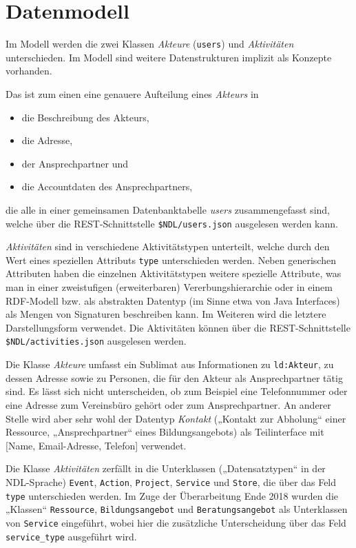 \documentclass[a4paper,11pt]{article}
\begin{document}
\section{Datenmodell}

Im Modell werden die zwei Klassen \emph{Akteure} (\texttt{users}) und
\emph{Aktivitäten} unterschieden.  Im Modell sind weitere Datenstrukturen
implizit als Konzepte vorhanden.

Das ist zum einen eine genauere Aufteilung eines \emph{Akteurs} in
\begin{itemize}\itemsep0pt
\item die Beschreibung des Akteurs,
\item die Adresse,
\item der Ansprechpartner und
\item die Accountdaten des Ansprechpartners,
\end{itemize}
die alle in einer gemeinsamen Datenbanktabelle \emph{users} zusammengefasst
sind, welche über die REST-Schnittstelle \texttt{\$NDL/users.json} ausgelesen
werden kann.

\emph{Aktivitäten} sind in verschiedene Aktivitätstypen unterteilt, welche
durch den Wert eines speziellen Attributs \texttt{type} unterschieden werden.
Neben generischen Attributen haben die einzelnen Aktivitätstypen weitere
spezielle Attribute, was man in einer zweistufigen (erweiterbaren)
Vererbungshierarchie oder in einem RDF-Modell bzw. als abstrakten Datentyp (im
Sinne etwa von Java Interfaces) als Mengen von Signaturen beschreiben kann.
Im Weiteren wird die letztere Darstellungsform verwendet. Die Aktivitäten
können über die REST-Schnittstelle \texttt{\$NDL/activities.json} ausgelesen
werden.

Die Klasse \emph{Akteure} umfasst ein Sublimat aus Informationen zu
\texttt{ld:Akteur}, zu dessen Adresse sowie zu Personen, die für den Akteur
als Ansprechpartner tätig sind.  Es lässt sich nicht unterscheiden, ob zum
Beispiel eine Telefonnummer oder eine Adresse zum Vereinsbüro gehört oder zum
Ansprechpartner.  An anderer Stelle wird aber sehr wohl der Datentyp
\emph{Kontakt} („Kontakt zur Abholung“ einer Ressource, „Ansprechpartner“
eines Bildungsangebots) als Teilinterface mit [Name, Email-Adresse, Telefon]
verwendet.

Die Klasse \emph{Aktivitäten} zerfällt in die Unterklassen („Datensatztypen“
in der NDL-Sprache) \texttt{Event}, \texttt{Action}, \texttt{Project},
\texttt{Service} und \texttt{Store}, die über das Feld \texttt{type}
unterschieden werden. Im Zuge der Überarbeitung Ende 2018 wurden die „Klassen“
\texttt{Ressource}, \texttt{Bildungsangebot} und \texttt{Beratungsangebot} als
Unterklassen von \texttt{Service} eingeführt, wobei hier die zusätzliche
Unterscheidung über das Feld \texttt{service\_type} ausgeführt wird.
\end{document}
